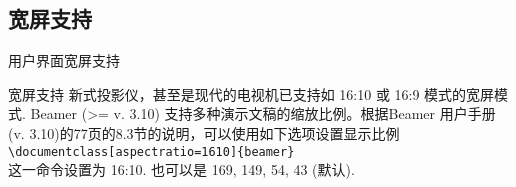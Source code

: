 \documentclass[xcolor=svgnames, t, aspectratio=169]{ctexbeamer}
\begin{document}
\subsection{宽屏支持}
\begin{frame}{用户界面}{宽屏支持}
  \begin{block}{宽屏支持}
    新式投影仪，甚至是现代的电视机已支持如 16:10 或 16:9 模式的宽屏模式.
    Beamer (>= v. 3.10) 支持多种演示文稿的缩放比例。根据Beamer 用户手册
    (v. 3.10)的77页的8.3节的说明，可以使用如下选项设置显示比例\\
    {\tt\textbackslash documentclass[aspectratio=1610]\{beamer\}}\\
    这一命令设置为 16:10. 也可以是 169, 149, 54, 43 (默认).
  \end{block}
\end{frame}

\end{document}
